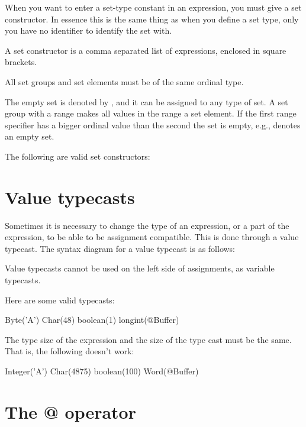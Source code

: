 \documentclass{report}
\begin{document}
When you want to enter a set-type constant in an expression, you must give a
set constructor. In essence this is the same thing as when you define a set
type, only you have no identifier to identify the set with.

A set constructor is a comma separated list of expressions, enclosed in
square brackets.



All set groups and set elements must be of the same ordinal type.

The empty set is denoted by \var{[]}, and it can be assigned to any type of
set. A set group with a range  \var{[A..Z]} makes all values in the range a
set element. If the first range specifier has a bigger ordinal value than
the second the set is empty, e.g., \var{[Z..A]} denotes an empty set.

The following are valid set constructors:

\begin{listing}
\end{listing}

\section{Value typecasts}

Sometimes it is necessary to change the type of an expression, or a part of
the expression, to be able to be assignment compatible. This is done through
a value typecast. The syntax diagram for a value typecast is as follows:



Value typecasts cannot be used on the left side of assignments, as variable
typecasts.

Here are some valid typecasts:
\begin{listing}
Byte('A')
Char(48)
boolean(1)
longint(@Buffer)
\end{listing}

The type size of the expression and the size of the type cast must be the
same. That is, the following doesn't work:
\begin{listing}
Integer('A')
Char(4875)
boolean(100)
Word(@Buffer)
\end{listing}

\section{The @ operator}
\end{document}
